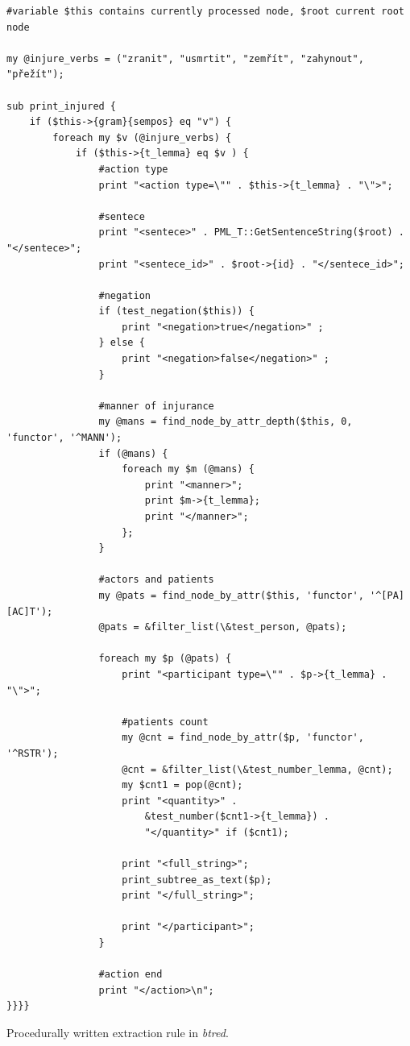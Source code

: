 \begin{listing}[ht]
\begin{verbatim}
#variable $this contains currently processed node, $root current root node

my @injure_verbs = ("zranit", "usmrtit", "zemřít", "zahynout", "přežít");

sub print_injured {
	if ($this->{gram}{sempos} eq "v") {
		foreach my $v (@injure_verbs) {
			if ($this->{t_lemma} eq $v ) {
				#action type
				print "<action type=\"" . $this->{t_lemma} . "\">";

				#sentece
				print "<sentece>" . PML_T::GetSentenceString($root) . "</sentece>";
				print "<sentece_id>" . $root->{id} . "</sentece_id>";
				
				#negation
				if (test_negation($this)) {
					print "<negation>true</negation>" ;					
				} else {
					print "<negation>false</negation>" ;										
				}
								
				#manner of injurance
				my @mans = find_node_by_attr_depth($this, 0, 'functor', '^MANN');
				if (@mans) {
					foreach my $m (@mans) {
						print "<manner>"; 
						print $m->{t_lemma};
						print "</manner>"; 
					};
				}
				
				#actors and patients
				my @pats = find_node_by_attr($this, 'functor', '^[PA][AC]T');
				@pats = &filter_list(\&test_person, @pats);
				
				foreach my $p (@pats) {
					print "<participant type=\"" . $p->{t_lemma} . "\">";

					#patients count
					my @cnt = find_node_by_attr($p, 'functor', '^RSTR');
					@cnt = &filter_list(\&test_number_lemma, @cnt);
					my $cnt1 = pop(@cnt);
					print "<quantity>" . 
						&test_number($cnt1->{t_lemma}) . 
						"</quantity>" if ($cnt1);
	
					print "<full_string>";
					print_subtree_as_text($p);
					print "</full_string>";

					print "</participant>";
				}
				
				#action end
				print "</action>\n";											
}}}}
\end{verbatim} 

\caption{Procedurally written extraction rule in \emph{btred}.}
\label{lst:btred_rule}
\end{listing}




